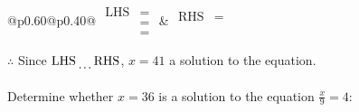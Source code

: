 \documentclass[12pt]{article}
\newcounter{minipagecount}
\begin{document}
\begin{multicols}{2}
\begin{minipage}[t]{0.40\textwidth}
    \noindent
    \renewcommand{\arraystretch}{1.3} %
    \begin{tabular}{@{}p{0.60\linewidth}@{}p{0.40\linewidth}@{}}
        \(\begin{aligned}
            \text{LHS} &=  \\
                    &=  \\
                    &= 
        \end{aligned}\) &
        \(\begin{aligned}
            \text{RHS} &= \\
                    & \\
                    &
        \end{aligned}\)
    \end{tabular}
    \renewcommand{\arraystretch}{1.0} %
    \vspace{2pt}  %

    \noindent \(\therefore\) Since \(\text{LHS} \dotuline{\hspace{5mm}} \text{RHS}\), \(x = 41\) \dotuline{\hspace{12mm}} a solution to the equation.

\end{minipage}

\vspace*{0.5ex}
\vfill{}
\noindent{(\theminipagecount)}\hspace{0.1mm} %
\begin{minipage}[t]{0.40\textwidth} %

    \noindent Determine whether \(x = 36\) is a solution to the equation \(\frac{x}{9} = 4\):
    \vspace{2pt}  %


\end{minipage}
\end{multicols}
\end{document}
